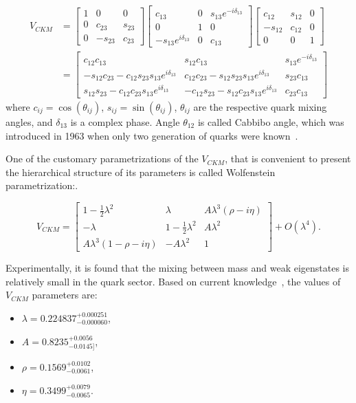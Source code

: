 \begin{align} V_{CKM}  &= \begin{bmatrix} 1 & 0 & 0 \\ 0 & c_{23} & s_{23} \\ 0 & -s_{23} & c_{23} \end{bmatrix}
 \begin{bmatrix} c_{13} & 0 & s_{13}e^{-i\delta_{13}} \\ 0 & 1 & 0 \\ -s_{13}e^{i\delta_{13}} & 0 & c_{13} \end{bmatrix}
 \begin{bmatrix} c_{12} & s_{12} & 0 \\ -s_{12} & c_{12} & 0 \\ 0 & 0 & 1 \end{bmatrix} \nonumber \\ 
 & = \begin{bmatrix} c_{12}c_{13} & s_{12} c_{13} & s_{13}e^{-i\delta_{13}} \\
 -s_{12}c_{23} - c_{12}s_{23}s_{13}e^{i\delta_{13}} & c_{12}c_{23} - s_{12}s_{23}s_{13}e^{i\delta_{13}} & s_{23}c_{13}\\
 s_{12}s_{23} - c_{12}c_{23}s_{13}e^{i\delta_{13}} & -c_{12}s_{23} - s_{12}c_{23}s_{13}e^{i\delta_{13}} & c_{23}c_{13} \end{bmatrix}
\end{align}
where $c_{ij} =\cos(\theta_{ij})$, $s_{ij} =\sin(\theta_{ij})$,  $\theta_{ij}$ are the respective quark mixing angles, and $\delta_{13}$ is a complex phase. Angle $\theta_{12}$ is called Cabbibo angle, which was introduced in 1963 when only two generation of quarks were known~\cite{cabibbo}. 


One of the customary parametrizations of the $V_{CKM}$, that is convenient to present the hierarchical structure of its parameters is called Wolfenstein~\cite{wolfenstein} parametrization:.

\begin{equation}
\label{eq:wolfenstein}
   V_{CKM} =  \begin{bmatrix} 1-\tfrac{1}{2}\lambda^2 & \lambda & A\lambda^3(\rho-i\eta) \\
 -\lambda & 1-\tfrac{1}{2}\lambda^2 & A\lambda^2 \\
 A\lambda^3(1-\rho-i\eta) & -A\lambda^2 & 1  \end{bmatrix} + O(\lambda^4).
\end{equation}

Experimentally, it is found that the mixing between mass and weak eigenstates is relatively small in the quark sector. Based on current knowledge~\cite{CKMFitter}, the values of $V_{CKM}$ parameters are:
\begin{itemize}
\item $\lambda=0.224837^{+0.000251}_{-0.000060}$,
 \item  $A= 0.8235^{+0.0056}_{-0.0145]}$, 
 \item  $\rho=0.1569^{+0.0102}_{-0.0061}$,
 \item  $\eta=0.3499^{+0.0079}_{-0.0065}$.
\end{itemize}

